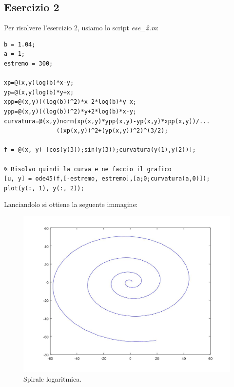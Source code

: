 \documentclass[11pt,a4paper,twoside,openright,titlepage,
headinclude,footinclude,BCOR5mm,
numbers=noenddot,cleardoublepage=empty,
tablecaptionabove]{scrbook}
\begin{document}
\subsection{Esercizio 2}
Per risolvere l'esercizio 2, usiamo lo script \emph{ese\_2.m}:
\begin{lstlisting}[frame = trBL]
% Imposto i parametri
b = 1.04;
a = 1;
estremo = 300;

xp=@(x,y)log(b)*x-y;
yp=@(x,y)log(b)*y+x;
xpp=@(x,y)((log(b))^2)*x-2*log(b)*y-x;
ypp=@(x,y)((log(b))^2)*y+2*log(b)*x-y;
curvatura=@(x,y)norm(xp(x,y)*ypp(x,y)-yp(x,y)*xpp(x,y))/...
               ((xp(x,y))^2+(yp(x,y))^2)^(3/2);

f = @(x, y) [cos(y(3));sin(y(3));curvatura(y(1),y(2))];

% Risolvo quindi la curva e ne faccio il grafico
[u, y] = ode45(f,[-estremo, estremo],[a;0;curvatura(a,0)]);
plot(y(:, 1), y(:, 2));
\end{lstlisting}
Lanciandolo si ottiene la seguente immagine:
\begin{center}
\begin{figure}[h!]
\includegraphics[width=\textwidth]{figs/spirale.jpg}
\caption{Spirale logaritmica.}
\end{figure}
\end{center}
\end{document}
